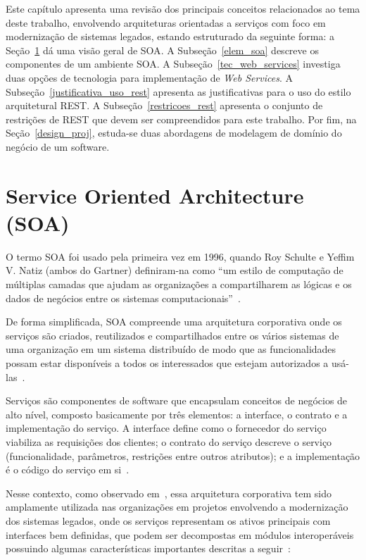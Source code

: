 \label{fundamentos}

Este capítulo apresenta uma revisão dos principais conceitos relacionados ao tema deste trabalho, 
envolvendo arquiteturas orientadas a serviços com foco em modernização de sistemas legados, estando estruturado da 
seguinte forma: a Se\c c\~{a}o~\ref{arq_soa} dá uma visão geral de \acrfull{SOA}. 
A Subseção~\ref{elem_soa} descreve os componentes de um ambiente \acrshort{SOA}.
A Subse\c c\~{a}o~\ref{tec_web_services} investiga duas opções de tecnologia para implementação de \textit{Web Services}. A Subse\c c\~{a}o~\ref{justificativa_uso_rest} apresenta as justificativas para o uso 
do estilo arquitetural \acrshort{REST}. A Subse\c c\~{a}o~\ref{restricoes_rest} apresenta o conjunto de restrições de \acrshort{REST} que devem ser compreendidos para este trabalho. Por fim, na Seção~\ref{design_proj},
estuda-se duas abordagens de modelagem de domínio do negócio de um software.


\section{Service Oriented Architecture (SOA)}%
\label{arq_soa}


O termo \acrshort{SOA} foi usado pela primeira vez em 1996, quando Roy Schulte e Yeffim V. Natiz (ambos do Gartner) definiram-na como ``um estilo de 
computação de múltiplas camadas que ajudam as organizações a compartilharem as lógicas e os dados de negócios entre os sistemas computacionais''~\cite{SOA_patterns_2012}.

De forma simplificada, \acrshort{SOA} compreende uma arquitetura corporativa onde os serviços são criados, reutilizados e compartilhados entre os vários sistemas de uma 
organização em um sistema distribuído de modo que as funcionalidades possam estar disponíveis a todos os interessados que estejam autorizados a usá-las~\cite{S05_Lewis:2005, S04_IntLgSw:2006}.

Serviços são componentes de software que encapsulam conceitos de negócios de alto nível, composto basicamente por três elementos: a interface, o contrato e a implementação do serviço. A interface define como o fornecedor do serviço viabiliza as requisições dos clientes; o contrato do serviço descreve o serviço (funcionalidade, parâmetros, restrições entre outros atributos); e a implementação é o código do serviço em si~\cite{krafzig2004service}. 

Nesse contexto, como observado em~\cite{SOAAprocIntegr:2007}, essa arquitetura corporativa tem sido amplamente utilizada nas organizações em projetos envolvendo a modernização dos sistemas legados, onde os serviços representam os ativos principais com interfaces bem definidas, que podem ser decompostas em módulos interoperáveis possuindo algumas características importantes descritas a seguir~\cite{fielding2000architectural,SOA_patterns_2012}:

